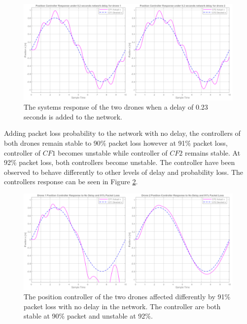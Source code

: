 
\begin{figure}[H]
\centering
 \includegraphics[scale=0.4]{Figures/2drones_2delay.png}
 \caption{The systems response of the two drones when a delay of 0.23 seconds is added to the network.}
 \label{figure:network_signal01}
\end{figure}

Adding packet loss probability to the network with no delay, the controllers of both drones remain stable to 90\% packet loss however at 91\% packet loss, controller of $CF1$ becomes unstable while controller of $CF2$ remains stable. At 92\% packet loss, both controllers become unstable. The controller have been observed to behave differently to other levels of delay and probability loss. The controllers response can be seen in Figure \ref{figure:loss01}.

\begin{figure}[H]
\centering
 \includegraphics[scale=0.4]{Figures/2drones_91prob.png}
 \caption{The position controller of the two drones affected differently by 91\% packet loss with no delay in the network. The controller are both stable at 90\% packet and unstable at 92\%.}
 \label{figure:loss01}
\end{figure}


